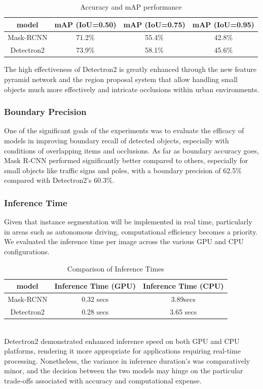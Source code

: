 \documentclass[conference]{IEEEtran}
\begin{document}
\begin{table}[htbp]
    \centering
    \caption{Accuracy and mAP performance}
    \label{table}
    \begin{tabular}{|c|c|c|c|}
    \hline
    \textbf{model}&\textbf{mAP (IoU=0.50)}&\textbf{mAP (IoU=0.75)}&\textbf{mAP (IoU=0.95)}\\
    \hline
    Mask-RCNN & 71.2\% & 55.4\% & 42.8\%\\
    \hline
    Detectron2 & 73.9\% & 58.1\% & 45.6\%\\
    \hline
    \end{tabular}
\end{table}
The high effectiveness of Detectron2 is greatly enhanced through the new feature pyramid network and the region proposal system that allow handling small objects much more effectively and intricate occlusions within urban environments.\\

\subsubsection{Boundary Precision}
One of the significant goals of the experiments was to evaluate the efficacy of models in improving boundary recall of detected objects, especially with conditions of overlapping items and occlusions. As far as boundary accuracy goes, Mask R-CNN performed significantly better compared to others, especially for small objects like traffic signs and poles, with a boundary precision of 62.5\% compared with Detectron2's 60.3\%.\\

\subsubsection{Inference Time}
Given that instance segmentation will be implemented in real time, particularly in areas such as autonomous driving, computational efficiency becomes a priority. We evaluated the inference time per image across the various GPU and CPU configurations.\\
\begin{table}[htbp]
    \centering
    \caption{Comparison of Inference Times}
    \label{table}
    \begin{tabular}{|c|c|c|}
    \hline
    \textbf{model}&\textbf{Inference Time (GPU)}&\textbf{Inference Time (CPU)}\\
    \hline
    Mask-RCNN & 0.32 secs & 3.89secs\\
    \hline
    Detectron2 & 0.28 secs & 3.65 secs\\
    \hline
    \end{tabular}
\end{table}
\\Detectron2 demonstrated enhanced inference speed on both GPU and CPU platforms, rendering it more appropriate for applications requiring real-time processing. Nonetheless, the variance in inference duration's was comparatively minor, and the decision between the two models may hinge on the particular trade-offs associated with accuracy and computational expense.\\
\end{document}
